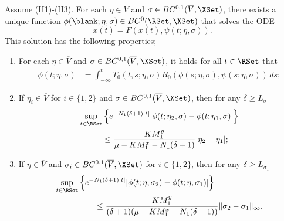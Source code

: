 \documentclass[a4paper]{siamart190516}
\begin{document}
\begin{lemma}\label{lem:bdd-sol-fast-subsystem}
Assume (H1)-(H3). For each $\eta \in \overline{V}$ and $\sigma \in BC^{0,1}(\overline{V},\XSet)$, there exists a unique function $\phi(\blank; \eta, \sigma) \in BC^0(\RSet, \XSet)$ that solves the ODE
\[
\dot{x}(t) = F(x(t),\psi(t;\eta,\sigma)).
\]
This solution has the following properties;
\begin{enumerate}
\item For each $\eta \in \overline{V}$ and $\sigma \in BC^{0,1}(\overline{V},\XSet)$, it holds for all $t \in \RSet$ that
\begin{align*}
\phi(t;\eta,\sigma) &=  \int_{-\infty}^t T_0(t,s; \eta, \sigma) R_0(\phi(s;\eta,\sigma),\psi(s;\eta,\sigma)) \, ds;
\end{align*}
\item If $\eta_i \in \overline{V}$ for $i \in \{1,2\}$ and  $\sigma \in BC^{0,1}(\overline{V}, \XSet)$, then for any $\delta \geq L_{\sigma}$ 
\begin{align*}
\sup_{t \in \RSet} & \left\{ e^{-N_1 (\delta + 1) |t|} |\phi(t;\eta_2,\sigma)  - \phi(t;\eta_1,\sigma) |   \right\} \\
& \leq \frac{K M_1^y}{\mu-K M_1^x-N_1(\delta +1)}  |\eta_2 - \eta_1| ;
\end{align*}
\item If $\eta \in \overline{V}$ and $\sigma_i \in BC^{0,1}(\overline{V},\XSet)$ for $i \in \{1,2\}$, then for any $\delta \geq L_{\sigma_1}$ 
\begin{align*}
\sup_{t \in \RSet} & \left\{ e^{-N_1 (\delta + 1) |t|}  |\phi(t;\eta,\sigma_2)  - \phi(t;\eta,\sigma_1)|  \right\} \\
&\qquad \leq \frac{K M_1^y}{(\delta+1)(\mu-K M_1^x-N_1(\delta +1))} \| \sigma_2 - \sigma_1 \|_{\infty} .
\end{align*}
\end{enumerate}
\end{lemma} 
\end{document}
